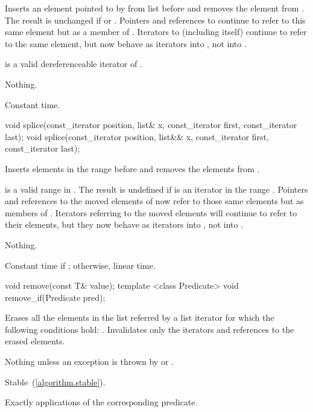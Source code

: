 \begin{itemdescr}
\pnum
\effects
Inserts an element pointed to by
from list
before  and removes the element from
.
The result is unchanged if
or
.
Pointers and references to
continue to refer to this same element but as a member of
.
Iterators
to
(including
itself) continue to refer to the same element, but now behave as iterators into
,
not into
.

\pnum
\requires
{}
is a valid dereferenceable iterator of
.

\pnum
\throws Nothing.

\pnum
\complexity
Constant time.
\end{itemdescr}

%
\begin{itemdecl}
void splice(const_iterator position, list& x, const_iterator first,
            const_iterator last);
void splice(const_iterator position, list&& x, const_iterator first,
            const_iterator last);
\end{itemdecl}

\begin{itemdescr}
\pnum
\effects
Inserts elements in the range
before
and removes the elements from
.

\pnum
\requires
\tcode{[first, last)}
is a valid range in
.
The result is undefined if
is an iterator in the range
.
Pointers and references to the moved elements of
now refer to those same elements but as members of
.
Iterators referring to the moved elements will continue to refer to their
elements, but they now behave as iterators into
,
not into
.

\pnum
\throws Nothing.

\pnum
\complexity
Constant time if
;
otherwise, linear time.
\end{itemdescr}

%
\begin{itemdecl}
void remove(const T& value);
template <class Predicate> void remove_if(Predicate pred);
\end{itemdecl}

\begin{itemdescr}
\pnum
\effects
Erases all the elements in the list referred by a list iterator  for which the
following conditions hold: .
Invalidates only the iterators and references to the erased elements.

\pnum
\throws
Nothing unless an exception is thrown by
or
.

\pnum
\remarks Stable~(\ref{algorithm.stable}).

\pnum
\complexity
Exactly
applications of the corresponding predicate.
\end{itemdescr}


